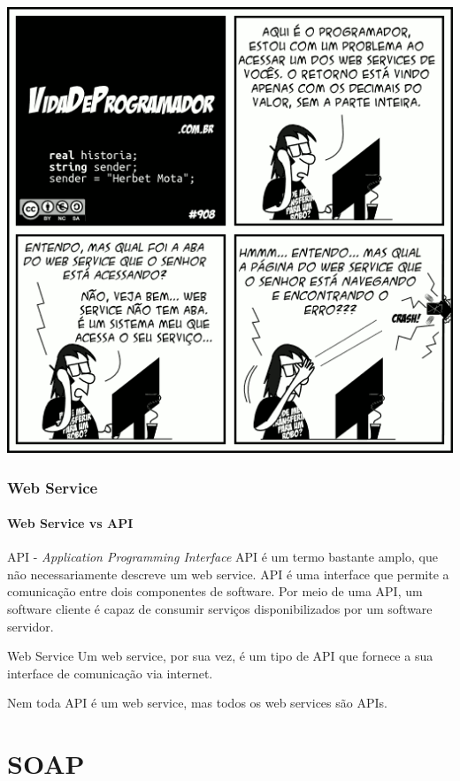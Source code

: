 \documentclass[
	9pt, %
	t, %
]{beamer}
\newcommand{\yellowbox}[1]{\colorbox{yellow!75}{#1}}
\begin{document}
\begin{frame}[plain, c]
	\centering
	\includegraphics[width=0.7\linewidth]{vdp_ws2.png}
\end{frame}

\begin{frame}
	\frametitle{Web Service}
	\framesubtitle{Web Service vs API}

	\begin{block}{API - \textit{Application Programming Interface}}
		API é um termo bastante amplo, que não necessariamente descreve um web service.
		API é uma interface que permite a comunicação entre dois componentes de software.
		Por meio de uma API, um software cliente é capaz de consumir serviços disponibilizados por um software servidor.
	\end{block}

	\begin{block}{Web Service}
		Um web service, por sua vez, é um tipo de API que fornece a sua interface de comunicação \yellowbox{via internet}.
	\end{block}

	\bigskip

	\begin{center}
		\yellowbox{Nem toda API é um web service, mas todos os web services são APIs.}
	\end{center}

\end{frame}


\section{SOAP}
\end{document}
